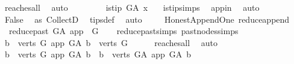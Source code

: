 \begin{isabellebody}
\ reaches{\isacharunderscore}{\kern0pt}all\ \isamarkupfalse%
\ auto\isanewline
\ \ \ \ \isamarkupfalse%
\ \isamarkupfalse%
\ {\isachardoublequoteopen}{\isasymnot}\ is{\isacharunderscore}{\kern0pt}tip\ G{\isacharunderscore}{\kern0pt}A\ x{\isachardoublequoteclose}\ \ \isamarkupfalse%
\ is{\isacharunderscore}{\kern0pt}tip{\isachardot}{\kern0pt}simps\ \isamarkupfalse%
\ app{\isacharunderscore}{\kern0pt}in\ \isamarkupfalse%
\ auto\isanewline
\ \ \ \ \isamarkupfalse%
\ \isamarkupfalse%
\ {\isachardoublequoteopen}False{\isachardoublequoteclose}\ \isamarkupfalse%
\ as{}\ CollectD\ \isamarkupfalse%
\ tips{\isacharunderscore}{\kern0pt}def\ \isamarkupfalse%
\ auto\isanewline
\ \ \isamarkupfalse%
\isanewline
{}\isamarkupfalse%
%
\endisatagproof
{\isafoldproof}%
%
\isadelimproof
\isanewline
%
\endisadelimproof
\isanewline
{}\isamarkupfalse%
\ {\isacharparenleft}{\kern0pt}\ Honest{\isacharunderscore}{\kern0pt}Append{\isacharunderscore}{\kern0pt}One{\isacharparenright}{\kern0pt}\ reduce{\isacharunderscore}{\kern0pt}append{\isacharcolon}{\kern0pt}\isanewline
\ \ {\isachardoublequoteopen}reduce{\isacharunderscore}{\kern0pt}past\ G{\isacharunderscore}{\kern0pt}A\ app\ {\isacharequal}{\kern0pt}\ G{\isachardoublequoteclose}\isanewline
%
\isadelimproof
\ \ %
\endisadelimproof
%
\isatagproof
{}\isamarkupfalse%
\ reduce{\isacharunderscore}{\kern0pt}past{\isachardot}{\kern0pt}simps\ past{\isacharunderscore}{\kern0pt}nodes{\isachardot}{\kern0pt}simps\ \isanewline
{}\isamarkupfalse%
\ {\isacharminus}{\kern0pt}\isanewline
\ \ \isamarkupfalse%
\ {\isachardoublequoteopen}{\isacharbraceleft}{\kern0pt}b\ {\isasymin}\ verts\ G{\isachardot}{\kern0pt}\ app\ {\isasymrightarrow}\isactrlsup {\isacharplus}{\kern0pt}\isactrlbsub G{\isacharunderscore}{\kern0pt}A\isactrlesub \ b{\isacharbraceright}{\kern0pt}\ {\isacharequal}{\kern0pt}\ verts\ G{\isachardoublequoteclose}\isanewline
\ \ \ \ \isamarkupfalse%
\ reaches{\isacharunderscore}{\kern0pt}all\ \isamarkupfalse%
\ auto\isanewline
\ \ \isamarkupfalse%
\ \isamarkupfalse%
\ {\isachardoublequoteopen}{\isacharbraceleft}{\kern0pt}b\ {\isasymin}\ verts\ G{\isachardot}{\kern0pt}\ app\ {\isasymrightarrow}\isactrlsup {\isacharplus}{\kern0pt}\isactrlbsub G{\isacharunderscore}{\kern0pt}A\isactrlesub \ b{\isacharbraceright}{\kern0pt}\ {\isacharequal}{\kern0pt}\ {\isacharbraceleft}{\kern0pt}b\ {\isasymin}\ verts\ G{\isacharunderscore}{\kern0pt}A{\isachardot}{\kern0pt}\ app\ {\isasymrightarrow}\isactrlsup {\isacharplus}{\kern0pt}\isactrlbsub G{\isacharunderscore}{\kern0pt}A\isactrlesub \ b{\isacharbraceright}{\kern0pt}{\isachardoublequoteclose}\isanewline

\end{isabellebody}
